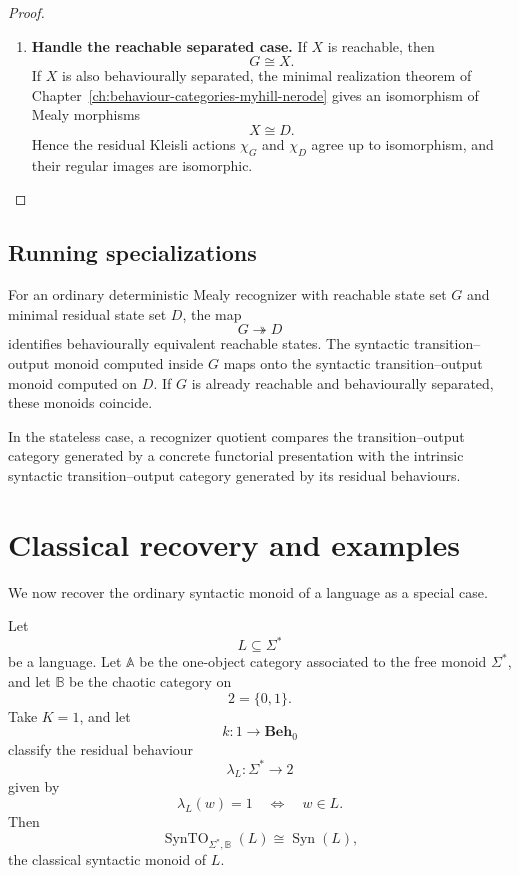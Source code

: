 \begin{proof}
\begin{enumerate}
        \item \textbf{Handle the reachable separated case.}
        If \(X\) is reachable, then
        \[
            G\cong X.
        \]
        If \(X\) is also behaviourally separated, the minimal realization theorem
        of Chapter~\ref{ch:behaviour-categories-myhill-nerode} gives an
        isomorphism of Mealy morphisms
        \[
            X\cong D.
        \]
        Hence the residual Kleisli actions \(\chi_G\) and \(\chi_D\) agree up
        to isomorphism, and their regular images are isomorphic.
    \end{enumerate}
\end{proof}

\subsection{Running specializations}
\label{subsec:syn-to-state-recognizer-running-specializations}

For an ordinary deterministic Mealy recognizer with reachable state set \(G\)
and minimal residual state set \(D\), the map
\[
    G\twoheadrightarrow D
\]
identifies behaviourally equivalent reachable states. The syntactic
transition--output monoid computed inside \(G\) maps onto the syntactic
transition--output monoid computed on \(D\). If \(G\) is already reachable and
behaviourally separated, these monoids coincide.

In the stateless case, a recognizer quotient compares the transition--output
category generated by a concrete functorial presentation with the intrinsic
syntactic transition--output category generated by its residual behaviours.

\section{Classical recovery and examples}
\label{sec:syn-to-classical-recovery-examples}

We now recover the ordinary syntactic monoid of a language as a special case.

\begin{theorem}
\label{thm:syn-to-classical-recovery}
    Let
    \[
        L\subseteq\Sigma^\ast
    \]
    be a language. Let \(\mathbb A\) be the one-object category associated to
    the free monoid \(\Sigma^\ast\), and let \(\mathbb B\) be the chaotic
    category on
    \[
        2=\{0,1\}.
    \]
    Take \(K=1\), and let
    \[
        k:1\to\mathbf{Beh}_0
    \]
    classify the residual behaviour
    \[
        \lambda_L:\Sigma^\ast\to 2
    \]
    given by
    \[
        \lambda_L(w)=1
        \quad\Longleftrightarrow\quad
        w\in L.
    \]
    Then
    \[
        \operatorname{SynTO}_{\Sigma^\ast,\mathbb B}(L)
        \cong
        \operatorname{Syn}(L),
    \]
    the classical syntactic monoid of \(L\).
\end{theorem}


